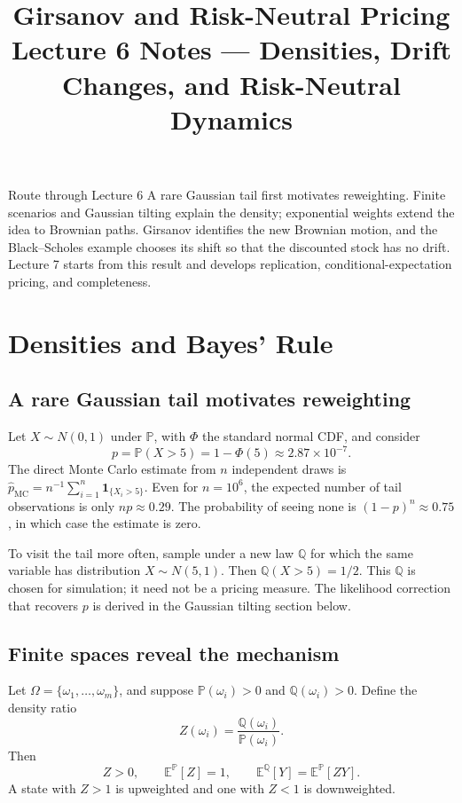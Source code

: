 \documentclass[10pt]{article}
\title{\textbf{Girsanov and Risk-Neutral Pricing}\\
\large Lecture 6 Notes --- Densities, Drift Changes, and Risk-Neutral Dynamics}
\author{}
\date{}
\newcommand{\E}{\mathbb E}
\newcommand{\Pp}{\mathbb P}
\newcommand{\Q}{\mathbb Q}
\newcommand{\1}{\mathbf 1}
\theoremstyle{definition}
\begin{document}
\maketitle
\vspace{-1.4em}

\begin{keyidea}{Route through Lecture 6}
A rare Gaussian tail first motivates reweighting. Finite scenarios and
Gaussian tilting explain the density; exponential weights extend the idea
to Brownian paths. Girsanov identifies the new
Brownian motion, and the Black--Scholes example chooses its shift so that
the discounted stock has no drift. Lecture 7 starts from this result and
develops replication, conditional-expectation pricing, and completeness.
\end{keyidea}

\section{Densities and Bayes' Rule}

\subsection{A rare Gaussian tail motivates reweighting}

Let \(X\sim N(0,1)\) under \(\Pp\), with \(\Phi\) the standard normal CDF, and consider
\[
p=\Pp(X>5)=1-\Phi(5)\approx2.87\times10^{-7}.
\]
The direct Monte Carlo estimate from \(n\) independent draws is
\(\widehat p_{\mathrm{MC}}=n^{-1}\sum_{i=1}^n\1_{\{X_i>5\}}\).
Even for \(n=10^6\), the expected number of tail observations is only
\(np\approx0.29\). The probability of seeing none is
\((1-p)^n\approx0.75\), in which case the estimate is zero.

To visit the tail more often, sample under a new law \(\Q\) for which the
same variable has distribution \(X\sim N(5,1)\). Then
\(\Q(X>5)=1/2\). This \(\Q\) is chosen for simulation; it need not be a
pricing measure. The likelihood correction that recovers \(p\) is derived
in the Gaussian tilting section below.

\subsection{Finite spaces reveal the mechanism}

Let \(\Omega=\{\omega_1,\ldots,\omega_m\}\), and suppose
\(\Pp(\omega_i)>0\) and \(\Q(\omega_i)>0\). Define the density ratio
\[
Z(\omega_i)=\frac{\Q(\omega_i)}{\Pp(\omega_i)}.
\]
Then
\[
Z>0,
\qquad
\E^{\Pp}[Z]=1,
\qquad
\boxed{\E^{\Q}[Y]=\E^{\Pp}[ZY].}
\]
A state with \(Z>1\) is upweighted and one with \(Z<1\) is downweighted.
\end{document}

